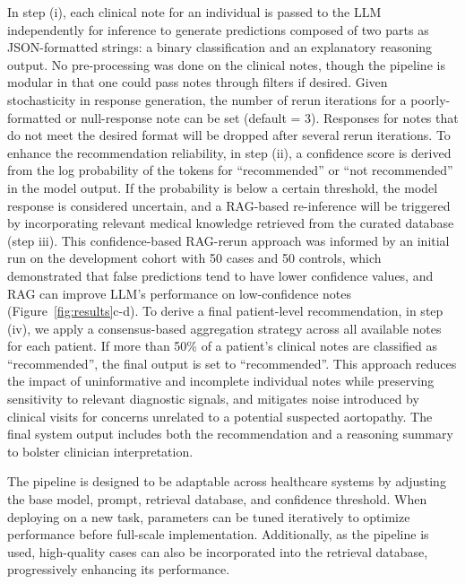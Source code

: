 \documentclass[fleqn,10pt]{wlscirep}
\begin{document}




In step (i), each clinical note for an individual is passed to the LLM independently for inference to generate predictions composed of two parts as JSON-formatted strings: a binary classification and an explanatory reasoning output. No pre-processing was done on the clinical notes, though the pipeline is modular in that one could pass notes through filters if desired. Given stochasticity in response generation, the number of rerun iterations for a poorly-formatted or null-response note can be set (default = 3). Responses for notes that do not meet the desired format will be dropped after several rerun iterations. To enhance the recommendation reliability, in step (ii), a confidence score is derived from the log probability of the tokens for “recommended” or “not recommended” in the model output. If the probability is below a certain threshold, the model response is considered uncertain, and a RAG-based re-inference will be triggered by incorporating relevant medical knowledge retrieved from the curated database (step iii). This confidence-based RAG-rerun approach was informed by an initial run on the development cohort with 50 cases and 50 controls, which demonstrated that false predictions tend to have lower confidence values, and RAG can improve LLM’s performance on low-confidence notes (Figure~\ref{fig:results}c-d). To derive a final patient-level recommendation, in step (iv), we apply a consensus-based aggregation strategy across all available notes for each patient. If more than 50\% of a patient’s clinical notes are classified as ``recommended'', the final output is set to ``recommended''. This approach reduces the impact of uninformative and incomplete individual notes while preserving sensitivity to relevant diagnostic signals, and mitigates noise introduced by clinical visits for concerns unrelated to a potential suspected aortopathy. The final system output includes both the recommendation and a reasoning summary to bolster clinician interpretation.

The pipeline is designed to be adaptable across healthcare systems by adjusting the base model, prompt, retrieval database, and confidence threshold. When deploying on a new task, parameters can be tuned iteratively to optimize performance before full-scale implementation. Additionally, as the pipeline is used, high-quality cases can also be incorporated into the retrieval database, progressively enhancing its performance.
\end{document}
